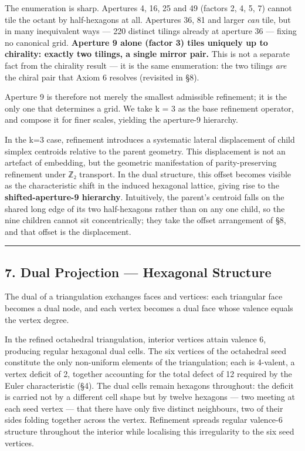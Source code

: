 \documentclass[
  11pt,
  a4paper,
]{article}
\begin{document}
The enumeration is sharp. Apertures 4, 16, 25 and 49 (factors 2, 4, 5,
7) cannot tile the octant by half-hexagons at all. Apertures 36, 81 and
larger \emph{can} tile, but in many inequivalent ways --- 220 distinct
tilings already at aperture 36 --- fixing no canonical grid.
\textbf{Aperture 9 alone (factor 3) tiles uniquely up to chirality:
exactly two tilings, a single mirror pair.} This is not a separate fact
from the chirality result --- it is the same enumeration: the two
tilings \emph{are} the chiral pair that Axiom 6 resolves (revisited in
§8).

Aperture 9 is therefore not merely the smallest admissible refinement;
it is the only one that determines a grid. We take k = 3 as the base
refinement operator, and compose it for finer scales, yielding the
aperture-9 hierarchy.

In the k=3 case, refinement introduces a systematic lateral displacement
of child simplex centroids relative to the parent geometry. This
displacement is not an artefact of embedding, but the geometric
manifestation of parity-preserving refinement under ℤ₂ transport. In the
dual structure, this offset becomes visible as the characteristic shift
in the induced hexagonal lattice, giving rise to the
\textbf{shifted-aperture-9 hierarchy}. Intuitively, the parent's
centroid falls on the shared long edge of its two half-hexagons rather
than on any one child, so the nine children cannot sit concentrically;
they take the offset arrangement of §8, and that offset is the
displacement.

\begin{center}\rule{0.5\linewidth}{0.5pt}\end{center}

\subsection{7. Dual Projection --- Hexagonal
Structure}\label{dual-projection-hexagonal-structure}

The dual of a triangulation exchanges faces and vertices: each
triangular face becomes a dual node, and each vertex becomes a dual face
whose valence equals the vertex degree.

In the refined octahedral triangulation, interior vertices attain
valence 6, producing regular hexagonal dual cells. The six vertices of
the octahedral seed constitute the only non-uniform elements of the
triangulation; each is 4-valent, a vertex deficit of 2, together
accounting for the total defect of 12 required by the Euler
characteristic (§4). The dual cells remain hexagons throughout: the
deficit is carried not by a different cell shape but by twelve hexagons
--- two meeting at each seed vertex --- that there have only five
distinct neighbours, two of their sides folding together across the
vertex. Refinement spreads regular valence-6 structure throughout the
interior while localising this irregularity to the six seed vertices.
\end{document}

